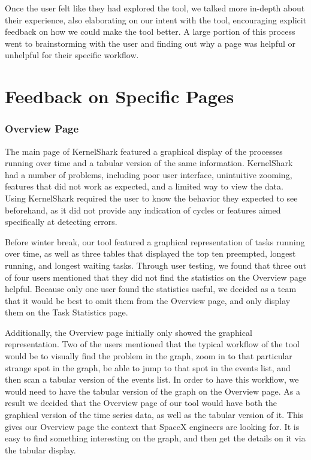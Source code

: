\documentclass{hmcclinic}
\begin{document}
Once the user felt like they had explored the tool, we talked more in-depth
about their experience, also elaborating on our intent with the tool,
encouraging explicit feedback on how we could make the tool better. A large
portion of this process went to brainstorming with the user and finding out why
a page was helpful or unhelpful for their specific workflow.

\section{Feedback on Specific Pages} %

\subsubsection{Overview Page}

The main page of KernelShark featured a graphical display of the processes
running over time and a tabular version of the same information. KernelShark had
a number of problems, including poor user interface, unintuitive zooming,
features that did not work as expected, and a limited way to view the data.
Using KernelShark required the user to know the behavior they expected to see
beforehand, as it did not provide any indication of cycles or features aimed
specifically at detecting errors.

Before winter break, our tool featured a graphical representation of tasks running over time,
as well as three tables that displayed the top ten preempted, longest running, and
longest waiting tasks. 
Through user testing, we found that three out of four users mentioned that they
did not find the statistics on the Overview page helpful. Because only one user found the statistics useful,
we decided as a team that it would be best to omit them from the Overview page, and
only display them on the Task Statistics page.

Additionally, the Overview page initially only showed the graphical
representation. Two of the users mentioned that the typical workflow of the tool
would be to visually find the problem in the graph, zoom in to that particular
strange spot in the graph, be able to jump to that spot in the events list, and
then scan a tabular version of the events list. In order to have this workflow,
we would need to have the tabular version of the graph on the Overview page.
As a result we decided that the Overview page of our tool would have both the
graphical version of the time series data, as well as the tabular version of it.
This gives our Overview page the context that SpaceX engineers are looking for.
It is easy to find something interesting on the graph, and then get the details
on it via the tabular display.
\end{document}

